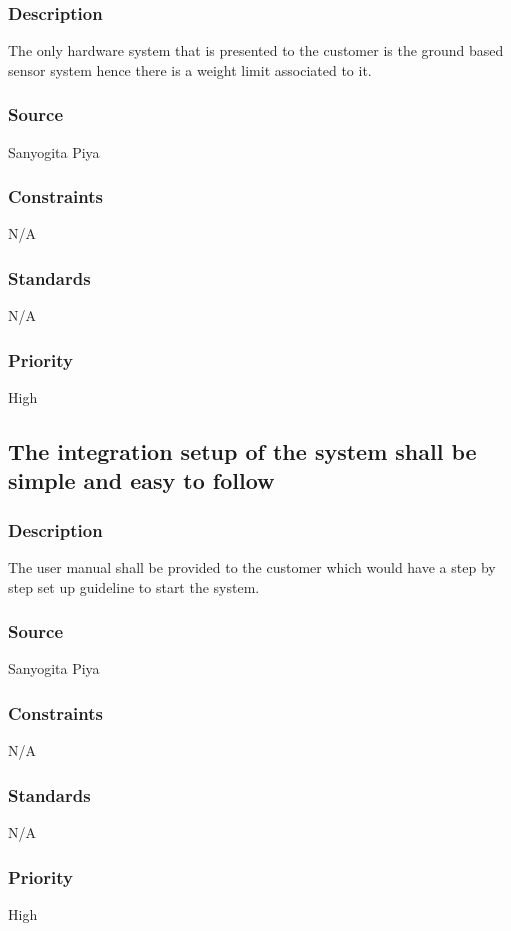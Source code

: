 \subsubsection{Description}
The only hardware system that is presented to the customer is the ground based sensor system hence there is a weight limit associated to it.
\subsubsection{Source}
Sanyogita Piya
\subsubsection{Constraints}
N/A
\subsubsection{Standards}
N/A
\subsubsection{Priority}
High


\subsection{The integration setup of the system shall be simple and easy to follow}
\subsubsection{Description}
The user manual shall be provided to the customer which would have a step by step set up guideline to start the system.
\subsubsection{Source}
Sanyogita Piya
\subsubsection{Constraints}
N/A
\subsubsection{Standards}
N/A
\subsubsection{Priority}
High

